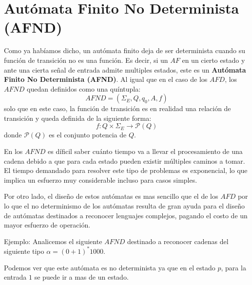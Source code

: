 \documentclass[12pt]{article}
\begin{document}
\section{Autómata Finito No Determinista (AFND)}
Como ya habíamos dicho, un autómata finito deja de ser determinista cuando su función de transición no es una función. Es decir, si un $ AF $ en un cierto estado y ante una cierta señal de entrada admite multiples estados, este es un \textbf{Autómata Finito No Determinista (AFND)}. Al igual que en el caso de los $ AFD $, los $ AFND $ quedan definidos como una quíntupla:
\[
AFND = \left(\Sigma_{E},Q,q_{0},A,f\right)
\]
solo que en este caso, la función de transición es en realidad una relación de transición y queda definida de la siguiente forma:
\[
f:Q\times \Sigma_{E} \to \mathcal{P}(Q) 
\]
donde $ \mathcal{P}(Q) $ es el conjunto potencia de $ Q $.

En los $ AFND $ es díficil saber cuánto tiempo va a llevar el procesamiento de una cadena debido a que para cada estado pueden existir múltiples caminos a tomar. El tiempo demandado para resolver este tipo de problemas es exponencial, lo que implica un esfuerzo muy considerable incluso para casos simples.

Por otro lado, el diseño de estos autómatas es mas sencillo que el de los $ AFD $ por lo que el no determinismo de los autómatas resulta de gran ayuda para el diseño de autómatas destinados a reconocer lenguajes complejos, pagando el costo de un mayor esfuerzo de operación.

Ejemplo: Analicemos el siguiente $ AFND $ destinado a reconocer cadenas del siguiente tipo $ \alpha=(0+1)^{*}1000 $.
\begin{center}
\end{center}

Podemos ver que este autómata es no determinista ya que en el estado $ p $, para la entrada $ 1 $ se puede ir a mas de un estado.
\end{document}
